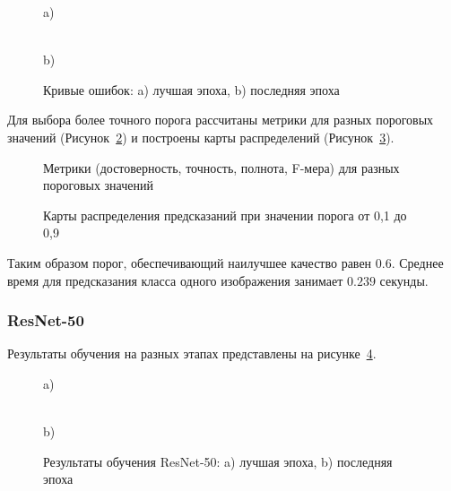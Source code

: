 \begin{figure}[H]
	\begin{minipage}[h]{0.49\linewidth}
		 a) \\
	\end{minipage}
	\hfill
	\begin{minipage}[h]{0.49\linewidth}
		 \\b)
	\end{minipage}
	\caption{Кривые ошибок: a) лучшая эпоха, b)
		последняя эпоха}
	\label{cp18-roc}
\end{figure}

Для выбора более точного порога рассчитаны метрики для разных пороговых значений (Рисунок~\ref{cp18-p}) и построены карты распределений (Рисунок~\ref{cp18-maps}). 

\begin{figure}[H]
	\center{\texttt{[image: cp18-p1]}} 
	\caption{Метрики (достоверность, точность, полнота, F-мера) для разных пороговых значений}
	\label{cp18-p}
\end{figure}

\begin{figure}[H]
	\caption{Карты распределения предсказаний при значении порога от 0,1 до 0,9}
	\label{cp18-maps}
\end{figure}

 Таким образом порог, обеспечивающий наилучшее качество равен $0.6$.  Среднее время для предсказания класса одного изображения занимает $0.239$ секунды.

\subsubsection{ResNet-50}
Результаты обучения на разных этапах представлены на рисунке~\ref{cp50epoch}.

\begin{figure}[H]
	\begin{minipage}[h]{0.55\linewidth}
		\center{\texttt{[image: cp50-1]}} a) \\
	\end{minipage}
	\hfill
	\begin{minipage}[h]{0.44\linewidth}
		\center{\texttt{[image: cp50-100]}} \\b)
	\end{minipage}
	\caption{Результаты обучения ResNet-50: a) лучшая эпоха, b)
		последняя эпоха}
	\label{cp50epoch}
\end{figure}

